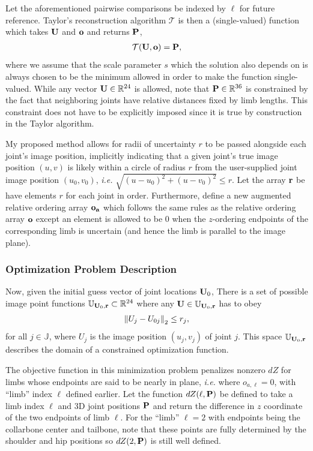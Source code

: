 \documentclass[final]{article}
\begin{document}
\begin{spacing}{1.1}
Let the aforementioned pairwise comparisons be indexed by $\ell$ for future reference. Taylor's reconstruction algorithm $\mathcal{T}$ is then a (single-valued) function which takes $\vb{U}$ and $\vb{o}$ and returns $\vb{P}$,
\begin{align}
  \mathcal{T}(\vb{U},\vb{o}) = \vb{P},
  \label{eq:Taylor}
\end{align}
where we assume that the scale parameter $s$ which the solution also depends on is always chosen to be the minimum allowed in order to make the function single-valued. While any vector $\vb{U} \in \mathbb{R}^{24}$ is allowed, note that $\vb{P} \in \mathbb{R}^{36}$ is constrained by the fact that neighboring joints have relative distances fixed by limb lengths. This constraint does not have to be explicitly imposed since it is true by construction in the Taylor algorithm.

My proposed method allows for radii of uncertainty $r$ to be passed alongside each joint's image position, implicitly indicating that a given joint's true image position $(u,v)$ is likely within a circle of radius $r$ from the user-supplied joint image position $(u_0,v_0)$, \emph{i.e.} $\sqrt{(u-u_0)^2 + (u-v_0)^2} \leq r$. Let the array $\vb{r}$ be have elements $r$ for each joint in order. Furthermore, define a new augmented relative ordering array $\vb{o_a}$ which follows the same rules as the relative ordering array $\vb{o}$ except an element is allowed to be $0$ when the $z$-ordering endpoints of the corresponding limb is uncertain (and hence the limb is parallel to the image plane).

\subsubsection{Optimization Problem Description}

Now, given the initial guess vector of joint locations $\vb{U}_0$, There is a set of possible image point functions $\mathbb{U}_{\vb{U}_0,\vb{r}} \subset \mathbb{R}^{24}$ where any $\vb{U} \in \mathbb{U}_{\vb{U}_0,\vb{r}}$ has to obey 
\begin{align}
  \norm{U_j - U_{0j}}_2 \leq r_j,
  \label{eq:ineqcons}
\end{align}
for all $j \in \mathbb{J}$, where $U_j$ is the image position $(u_j,v_j)$ of joint $j$. This space $\mathbb{U}_{\vb{U}_0,\vb{r}}$ describes the domain of a constrained optimization function.

The objective function in this minimization problem penalizes nonzero $dZ$ for limbs whose endpoints are said to be nearly in plane, \emph{i.e.} where $o_{a,\ell} = 0$, with ``limb'' index $\ell$ defined earlier. Let the function $dZ(\ell,\vb{P})$ be defined to take a limb index $\ell$ and 3D joint positions $\vb{P}$ and return the difference in $z$ coordinate of the two endpoints of limb $\ell$. For the ``limb'' $\ell = 2$ with endpoints being the collarbone center and tailbone, note that these points are fully determined by the shoulder and hip positions so $dZ(2,\vb{P})$ is still well defined.


\end{spacing}
\end{document}
